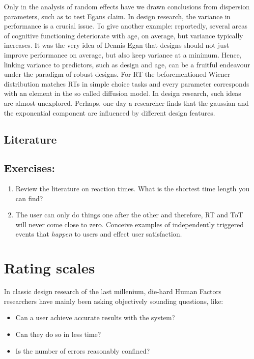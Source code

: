 \documentclass[]{svmono}
\providecommand{\tightlist}{%
  \setlength{\itemsep}{0pt}\setlength{\parskip}{0pt}}
\theoremstyle{definition}
\theoremstyle{definition}
\theoremstyle{definition}
\theoremstyle{remark}
\begin{document}
Only in the analysis of random effects have we drawn conclusions from
dispersion parameters, such as to test Egans claim. In design research,
the variance in performance is a crucial issue. To give another example:
reportedly, several areas of cognitive functioning deteriorate with age,
on average, but variance typically increases. It was the very idea of
Dennis Egan that designs should not just improve performance on average,
but also keep variance at a minimum. Hence, linking variance to
predictors, such as design and age, can be a fruitful endeavour under
the paradigm of robust designs. For RT the beforementioned Wiener
distribution matches RTs in simple choice tasks and every parameter
corresponds with an element in the so called diffusion model. In design
research, such ideas are almost unexplored. Perhaps, one day a
researcher finds that the gaussian and the exponential component are
influenced by different design features.

\subsection{Literature}\label{literature}

\subsection{Exercises:}\label{exercises-9}

\begin{enumerate}
\def\labelenumi{\arabic{enumi}.}
\item
  Review the literature on reaction times. What is the shortest time
  length you can find?
\item
  The user can only do things one after the other and therefore, RT and
  ToT will never come close to zero. Conceive examples of independently
  triggered events that \emph{happen} to users and effect user
  satisfaction.
\end{enumerate}

\section{Rating scales}\label{rating-scales}

In classic design research of the last millenium, die-hard Human Factors
researchers have mainly been asking objectively sounding questions,
like:

\begin{itemize}
\tightlist
\item
  Can a user achieve accurate results with the system?
\item
  Can they do so in less time?
\item
  Is the number of errors reasonably confined?
\end{itemize}
\end{document}
